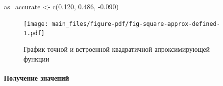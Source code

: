 \documentclass[
  letterpaper,
  DIV=11,
  numbers=noendperiod]{scrartcl}
\let\oldparagraph\paragraph
\renewcommand{\paragraph}[1]{\oldparagraph{#1}\mbox{}}
\newenvironment{Shaded}{\begin{snugshade}}{\end{snugshade}}
\newcommand{\FloatTok}[1]{\textcolor[rgb]{0.68,0.00,0.00}{#1}}
\newcommand{\FunctionTok}[1]{\textcolor[rgb]{0.28,0.35,0.67}{#1}}
\newcommand{\NormalTok}[1]{\textcolor[rgb]{0.00,0.23,0.31}{#1}}
\newcommand{\OtherTok}[1]{\textcolor[rgb]{0.00,0.23,0.31}{#1}}
\newcommand{\SpecialCharTok}[1]{\textcolor[rgb]{0.37,0.37,0.37}{#1}}
\begin{document}
\begin{Shaded}
\begin{Highlighting}[]
\NormalTok{as\_accurate }\OtherTok{\textless{}{-}} \FunctionTok{c}\NormalTok{(}\FloatTok{0.120}\NormalTok{, }\FloatTok{0.486}\NormalTok{, }\SpecialCharTok{{-}}\FloatTok{0.090}\NormalTok{)}
\end{Highlighting}
\end{Shaded}

\begin{figure}

{\centering \texttt{[image: main\_files/figure-pdf/fig-square-approx-defined-1.pdf]}

}

\caption{\label{fig-square-approx-defined}График точной и встроенной
квадратичной апроксимирующей функции}

\end{figure}

\paragraph{Получение
значений}\label{ux43fux43eux43bux443ux447ux435ux43dux438ux435-ux437ux43dux430ux447ux435ux43dux438ux439-1}
\end{document}
